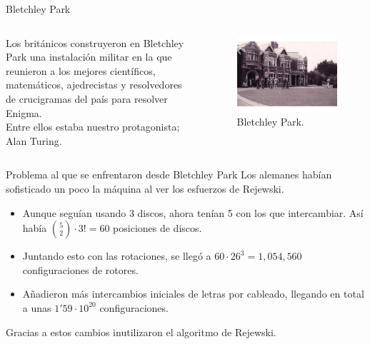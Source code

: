 \documentclass[aspectratio=169]{beamer}
\begin{document}
\begin{frame}{Bletchley Park}

\begin{columns}
    \begin{column}{0.5\textwidth}
    Los británicos construyeron en Bletchley Park una instalación militar en la que reunieron a los mejores científicos, matemáticos, ajedrecistas y resolvedores de crucigramas del país para resolver Enigma.\\
    Entre ellos estaba nuestro protagonista; Alan Turing.

    \end{column}
    \begin{column}{0.5\textwidth}
        \begin{figure}
            \centering
    \includegraphics[width=0.65\linewidth]{pic/bletchley-park.png}
            \caption{Bletchley Park.}
        \end{figure}
    \end{column}
\end{columns}
\end{frame}


\begin{frame}{Problema al que se enfrentaron desde Bletchley Park}
Los alemanes habían sofisticado un poco la máquina al ver los esfuerzos de Rejewski.
\begin{itemize}
    \item Aunque seguían usando 3 discos, ahora tenían 5 con los que intercambiar. Así había $\binom{5}{2}\cdot 3! = 60$ posiciones de discos.
    \item Juntando esto con las rotaciones, se llegó a $60 \cdot 26^3 = 1, 054, 560$ configuraciones de rotores.
    \item Añadieron más intercambios iniciales de letras por cableado, llegando en total a unas $1'59\cdot 10^{20}$ configuraciones.
\end{itemize}
Gracias a estos cambios inutilizaron el algoritmo de Rejewski.
\end{frame}
\end{document}
